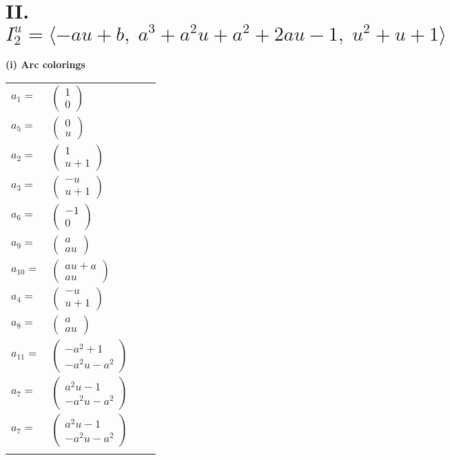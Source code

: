\documentclass[1p]{elsarticle_modified}
\theoremstyle{definition}
\begin{document}
\centering \section*{II. $I^u_{2}= \langle - a u+b,\;a^3+a^2 u+a^2+2 a u-1,\;u^2+u+1 \rangle$}
\flushleft \textbf{(i) Arc colorings}\\
\begin{tabular}{m{7pt} m{180pt} m{7pt} m{180pt} }
\flushright $a_{1}=$&$\begin{pmatrix}1\\0\end{pmatrix}$ \\
\flushright $a_{5}=$&$\begin{pmatrix}0\\u\end{pmatrix}$ \\
\flushright $a_{2}=$&$\begin{pmatrix}1\\u+1\end{pmatrix}$ \\
\flushright $a_{3}=$&$\begin{pmatrix}- u\\u+1\end{pmatrix}$ \\
\flushright $a_{6}=$&$\begin{pmatrix}-1\\0\end{pmatrix}$ \\
\flushright $a_{9}=$&$\begin{pmatrix}a\\a u\end{pmatrix}$ \\
\flushright $a_{10}=$&$\begin{pmatrix}a u+a\\a u\end{pmatrix}$ \\
\flushright $a_{4}=$&$\begin{pmatrix}- u\\u+1\end{pmatrix}$ \\
\flushright $a_{8}=$&$\begin{pmatrix}a\\a u\end{pmatrix}$ \\
\flushright $a_{11}=$&$\begin{pmatrix}- a^2+1\\- a^2 u- a^2\end{pmatrix}$ \\
\flushright $a_{7}=$&$\begin{pmatrix}a^2 u-1\\- a^2 u- a^2\end{pmatrix}$\\ \flushright $a_{7}=$&$\begin{pmatrix}a^2 u-1\\- a^2 u- a^2\end{pmatrix}$\\&\end{tabular}
\end{document}
